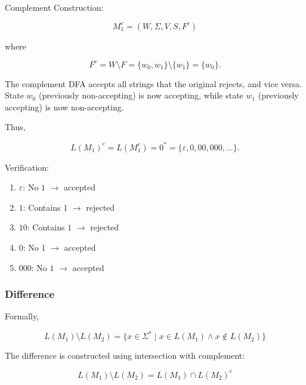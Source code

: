 \documentclass[12pt,a4paper,openany]{article}
\begin{document}
Complement Construction:

\[
M_1^c = (W,\Sigma,V,S,F^c)
\]

where

\[
F^c = W \setminus F = \{w_0,w_1\} \setminus \{w_1\} = \{w_0\}.
\]

\begin{center}
\end{center}

The complement DFA accepts all strings that the original rejects, and vice versa. State $w_0$ (previously non-accepting) is now accepting, while state $w_1$ (previously accepting) is now non-accepting.

Thus,

\[
L(M_1)^c = L(M_1^c) = 0^* = \{\varepsilon, 0, 00, 000, \ldots\}.
\]

Verification:

\begin{enumerate}
    \item $\varepsilon$: No $1$ $\to$ accepted 
    \item $1$: Contains $1$ $\to$ rejected 
    \item $10$: Contains $1$ $\to$ rejected
    \item $0$: No $1$ $\to$ accepted 
    \item $000$: No $1$ $\to$ accepted 
\end{enumerate}

\subsubsection{Difference}

Formally,

\[L(M_1) \setminus L(M_2) = \{x \in \Sigma^* \mid x \in L(M_1) \land x \notin L(M_2)\}\]

The difference is constructed using intersection with complement:

\[L(M_1) \setminus L(M_2) = L(M_1) \cap L(M_2)^c\]
\end{document}
